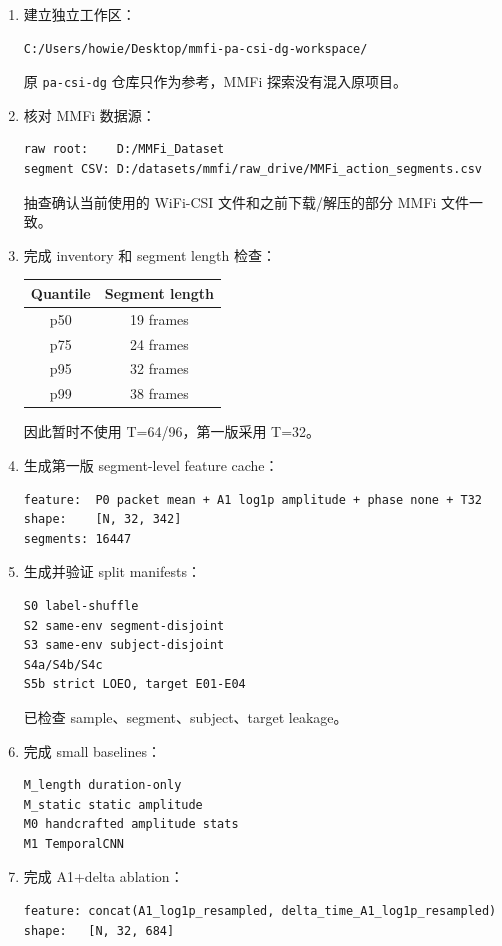 \documentclass[UTF8,11pt]{ctexart}
\begin{document}
\begin{enumerate}
  \item 建立独立工作区：
\begin{verbatim}
C:/Users/howie/Desktop/mmfi-pa-csi-dg-workspace/
\end{verbatim}
  原 \texttt{pa-csi-dg} 仓库只作为参考，MMFi 探索没有混入原项目。

  \item 核对 MMFi 数据源：
\begin{verbatim}
raw root:    D:/MMFi_Dataset
segment CSV: D:/datasets/mmfi/raw_drive/MMFi_action_segments.csv
\end{verbatim}
  抽查确认当前使用的 WiFi-CSI 文件和之前下载/解压的部分 MMFi 文件一致。

  \item 完成 inventory 和 segment length 检查：
\begin{center}
\begin{tabular}{cc}
\toprule
Quantile & Segment length \\
\midrule
p50 & 19 frames \\
p75 & 24 frames \\
p95 & 32 frames \\
p99 & 38 frames \\
\bottomrule
\end{tabular}
\end{center}
  因此暂时不使用 T=64/96，第一版采用 T=32。

  \item 生成第一版 segment-level feature cache：
\begin{verbatim}
feature:  P0 packet mean + A1 log1p amplitude + phase none + T32
shape:    [N, 32, 342]
segments: 16447
\end{verbatim}

  \item 生成并验证 split manifests：
\begin{verbatim}
S0 label-shuffle
S2 same-env segment-disjoint
S3 same-env subject-disjoint
S4a/S4b/S4c
S5b strict LOEO, target E01-E04
\end{verbatim}
  已检查 sample、segment、subject、target leakage。

  \item 完成 small baselines：
\begin{verbatim}
M_length duration-only
M_static static amplitude
M0 handcrafted amplitude stats
M1 TemporalCNN
\end{verbatim}

  \item 完成 A1+delta ablation：
\begin{verbatim}
feature: concat(A1_log1p_resampled, delta_time_A1_log1p_resampled)
shape:   [N, 32, 684]
\end{verbatim}


\end{enumerate}
\end{document}
